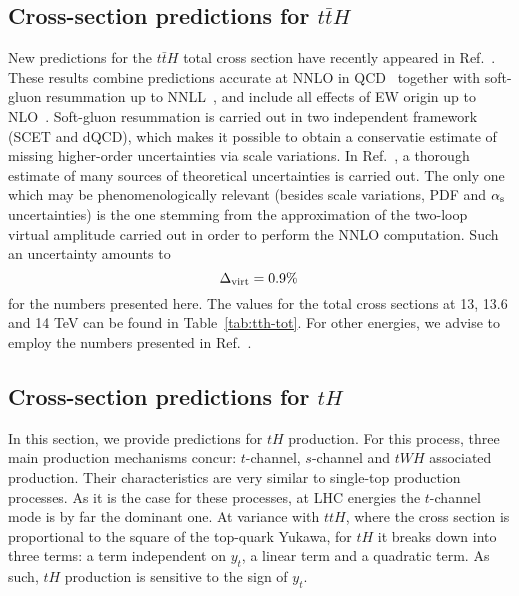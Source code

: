 
\subsection{Cross-section predictions for $t\bar t H$}
\label{sec:results-xsects-tth}
New predictions for the $t\bar t H$ total cross section have recently appeared in Ref.~\cite{Balsach:2025jcw}. These results
combine predictions accurate at NNLO in QCD~\cite{Catani:2022mfv,Devoto:2024nhl} together with soft-gluon resummation up to NNLL~\cite{Kulesza:2015vda,Broggio:2015lya,Broggio:2016lfj,
Kulesza:2017ukk,Kulesza:2018tqz,Broggio:2019ewu,Kulesza:2020nfh}, and include all effects of EW origin up to NLO~\cite{Frixione:2014qaa,Frixione:2015zaa,Frederix:2018nkq}.
Soft-gluon resummation is carried out in two independent framework (SCET and dQCD), which makes it possible to obtain a conservatie estimate of missing higher-order
uncertainties via scale variations. In Ref.~\cite{Balsach:2025jcw}, a thorough estimate of many sources of theoretical uncertainties is carried out.
The only one which may be phenomenologically relevant (besides scale variations, PDF and $\alpha_{\mathrm{s}}$ uncertainties) is the one stemming 
from the approximation of the two-loop virtual amplitude carried out in order to perform the NNLO computation. Such an uncertainty amounts to
\begin{equation}
    \Delta_{\rm virt} = 0.9\%\,
\end{equation}
for the numbers presented here.
The values for the total cross sections at 13, 13.6 and 14 TeV can be found in Table~\ref{tab:tth-tot}. For other energies, we advise to employ the numbers
presented in Ref.~\cite{Karlberg:2024zxx}.



\subsection{Cross-section predictions for $t H$}
\label{sec:results-xsects-singleth}
In this section, we provide predictions for $tH$ production. 
For this process, three main production mechanisms concur: 
$t$-channel, $s$-channel and $tWH$ associated production. Their characteristics are very similar to single-top production processes. As it is the case
for these processes, at LHC energies the $t$-channel mode is by far the dominant one. At variance with $ttH$, where the cross section
is proportional to the square of the top-quark Yukawa, for $tH$ it breaks down into three terms: a term independent on $y_t$, a linear term and a quadratic
term. As such, $tH$ production is sensitive to the sign of $y_t$. 

